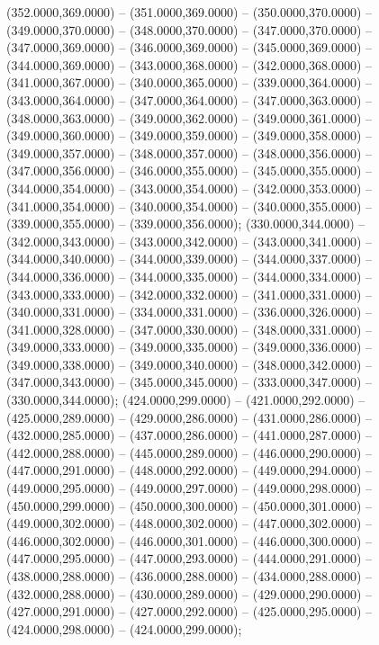 \begin{scope}[draw=black,fill=cd7191c,line join=round,line width=0.208pt]
    (352.0000,369.0000) -- (351.0000,369.0000) -- (350.0000,370.0000) --
    (349.0000,370.0000) -- (348.0000,370.0000) -- (347.0000,370.0000) --
    (347.0000,369.0000) -- (346.0000,369.0000) -- (345.0000,369.0000) --
    (344.0000,369.0000) -- (343.0000,368.0000) -- (342.0000,368.0000) --
    (341.0000,367.0000) -- (340.0000,365.0000) -- (339.0000,364.0000) --
    (343.0000,364.0000) -- (347.0000,364.0000) -- (347.0000,363.0000) --
    (348.0000,363.0000) -- (349.0000,362.0000) -- (349.0000,361.0000) --
    (349.0000,360.0000) -- (349.0000,359.0000) -- (349.0000,358.0000) --
    (349.0000,357.0000) -- (348.0000,357.0000) -- (348.0000,356.0000) --
    (347.0000,356.0000) -- (346.0000,355.0000) -- (345.0000,355.0000) --
    (344.0000,354.0000) -- (343.0000,354.0000) -- (342.0000,353.0000) --
    (341.0000,354.0000) -- (340.0000,354.0000) -- (340.0000,355.0000) --
    (339.0000,355.0000) -- (339.0000,356.0000);
   (330.0000,344.0000) -- (342.0000,343.0000) --
    (343.0000,342.0000) -- (343.0000,341.0000) -- (344.0000,340.0000) --
    (344.0000,339.0000) -- (344.0000,337.0000) -- (344.0000,336.0000) --
    (344.0000,335.0000) -- (344.0000,334.0000) -- (343.0000,333.0000) --
    (342.0000,332.0000) -- (341.0000,331.0000) -- (340.0000,331.0000) --
    (334.0000,331.0000) -- (336.0000,326.0000) -- (341.0000,328.0000) --
    (347.0000,330.0000) -- (348.0000,331.0000) -- (349.0000,333.0000) --
    (349.0000,335.0000) -- (349.0000,336.0000) -- (349.0000,338.0000) --
    (349.0000,340.0000) -- (348.0000,342.0000) -- (347.0000,343.0000) --
    (345.0000,345.0000) -- (333.0000,347.0000) -- (330.0000,344.0000);
   (424.0000,299.0000) -- (421.0000,292.0000) --
    (425.0000,289.0000) -- (429.0000,286.0000) -- (431.0000,286.0000) --
    (432.0000,285.0000) -- (437.0000,286.0000) -- (441.0000,287.0000) --
    (442.0000,288.0000) -- (445.0000,289.0000) -- (446.0000,290.0000) --
    (447.0000,291.0000) -- (448.0000,292.0000) -- (449.0000,294.0000) --
    (449.0000,295.0000) -- (449.0000,297.0000) -- (449.0000,298.0000) --
    (450.0000,299.0000) -- (450.0000,300.0000) -- (450.0000,301.0000) --
    (449.0000,302.0000) -- (448.0000,302.0000) -- (447.0000,302.0000) --
    (446.0000,302.0000) -- (446.0000,301.0000) -- (446.0000,300.0000) --
    (447.0000,295.0000) -- (447.0000,293.0000) -- (444.0000,291.0000) --
    (438.0000,288.0000) -- (436.0000,288.0000) -- (434.0000,288.0000) --
    (432.0000,288.0000) -- (430.0000,289.0000) -- (429.0000,290.0000) --
    (427.0000,291.0000) -- (427.0000,292.0000) -- (425.0000,295.0000) --
    (424.0000,298.0000) -- (424.0000,299.0000);

\end{scope}

